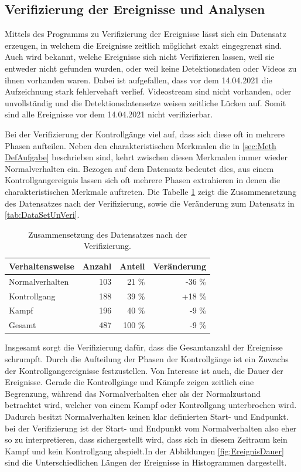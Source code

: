 \subsection{Verifizierung der Ereignisse und Analysen}
Mittels des Programms zu Verifizierung der Ereignisse lässt sich ein Datensatz erzeugen, in welchem die Ereignisse zeitlich möglichst exakt eingegrenzt sind. Auch wird bekannt, welche Ereignisse sich nicht Verifizieren lassen, weil sie entweder nicht gefunden wurden, oder weil keine Detektionsdaten oder Videos zu ihnen vorhanden waren. Dabei ist aufgefallen, dass vor dem 14.04.2021 die Aufzeichnung stark fehlervehaft verlief. Videostream sind nicht vorhanden, oder unvollständig und die Detektionsdatensetze weisen zeitliche Lücken auf. Somit sind alle Ereignisse vor dem 14.04.2021 nicht verifizierbar. \par

Bei der Verifizierung der Kontrollgänge viel auf, dass sich diese oft in mehrere Phasen aufteilen. Neben den charakteristischen Merkmalen die in \ref{sec:Meth DefAufgabe} beschrieben sind, kehrt zwischen diesen Merkmalen immer wieder Normalverhalten ein. Bezogen auf dem Datensatz bedeutet dies, aus einem Kontrollgangereignis lassen sich oft mehrere Phasen extrahieren in denen die  charakteristischen Merkmale auftreten. Die Tabelle \ref{tab:DataSetVeri} zeigt die Zusammensetzung des Datensatzes nach der Verifizierung, sowie die Veränderung zum Datensatz in \ref{tab:DataSetUnVeri}. 

\begin{table}[ht]
    \centering
    \caption{Zusammensetzung des Datensatzes nach der Verifizierung.}
    \begin{tabular}{|l|r|r|r|}
    \hline
        Verhaltensweise & Anzahl & Anteil & Veränderung\\
    \hline
        Normalverhalten & 103 & 21 \% & -36 \%\\
        Kontrollgang & 188 & 39 \% & +18 \%\\
        Kampf & 196 & 40 \% & -9 \%\\
    \hline
    \hline
        Gesamt & 487 & 100 \% & -9 \% \\
    \hline
    \end{tabular}
    \label{tab:DataSetVeri}
\end{table}

Insgesamt sorgt die Verifizierung dafür, dass die Gesamtanzahl der Ereignisse schrumpft. Durch die Aufteilung der Phasen der Kontrollgänge ist ein Zuwachs der Kontrollgangereignisse festzustellen. Von Interesse ist auch, die Dauer der Ereignisse. Gerade die Kontrollgänge und Kämpfe zeigen zeitlich eine Begrenzung, während das Normalverhalten eher als der Normalzustand betrachtet wird, welcher von einem Kampf oder Kontrollgang unterbrochen wird. Dadurch besitzt Normalverhalten keinen klar definierten Start- und Endpunkt. bei der Verifizierung ist der Start- und Endpunkt vom Normalverhalten also eher so zu interpretieren, dass sichergestellt wird, dass sich in diesem Zeitraum kein Kampf und kein Kontrollgang abspielt.In der Abbildungen \ref{fig:EreignisDauer} sind die Unterschiedlichen Längen der Ereignisse in Histogrammen dargestellt.

